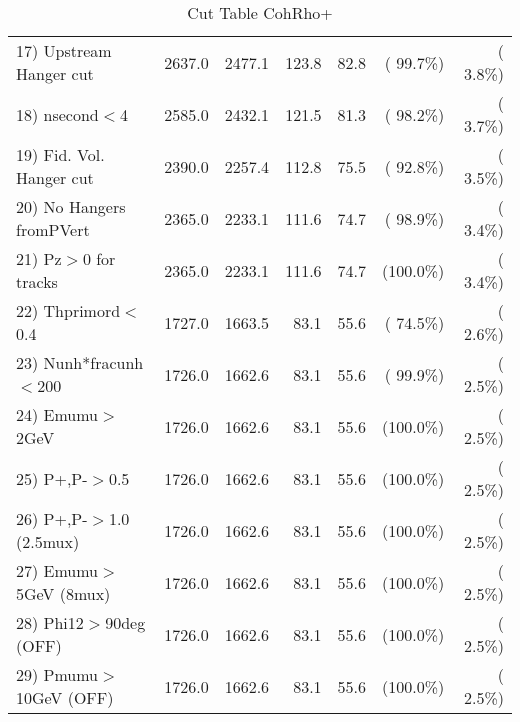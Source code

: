\begin{table}[h!]
\begin{tabular}{||l||r|r|r|r|r|r||}
 17) Upstream Hanger cut  &       2637.0 &       2477.1 &        123.8 &         82.8 & ( 99.7\%) & (  3.8\%) \\
 18) nsecond$<$4          &       2585.0 &       2432.1 &        121.5 &         81.3 & ( 98.2\%) & (  3.7\%) \\
 19) Fid. Vol. Hanger cut &       2390.0 &       2257.4 &        112.8 &         75.5 & ( 92.8\%) & (  3.5\%) \\
 20) No Hangers fromPVert &       2365.0 &       2233.1 &        111.6 &         74.7 & ( 98.9\%) & (  3.4\%) \\
 21) Pz$>$0 for tracks    &       2365.0 &       2233.1 &        111.6 &         74.7 & (100.0\%) & (  3.4\%) \\
 22) Thprimord$<$0.4      &       1727.0 &       1663.5 &         83.1 &         55.6 & ( 74.5\%) & (  2.6\%) \\
 23) Nunh*fracunh$<$200   &       1726.0 &       1662.6 &         83.1 &         55.6 & ( 99.9\%) & (  2.5\%) \\
 24) Emumu$>$2GeV         &       1726.0 &       1662.6 &         83.1 &         55.6 & (100.0\%) & (  2.5\%) \\
 25) P+,P-$>$0.5          &       1726.0 &       1662.6 &         83.1 &         55.6 & (100.0\%) & (  2.5\%) \\
 26) P+,P-$>$1.0 (2.5mux) &       1726.0 &       1662.6 &         83.1 &         55.6 & (100.0\%) & (  2.5\%) \\
 27) Emumu$>$5GeV  (8mux) &       1726.0 &       1662.6 &         83.1 &         55.6 & (100.0\%) & (  2.5\%) \\
 28) Phi12$>$90deg  (OFF) &       1726.0 &       1662.6 &         83.1 &         55.6 & (100.0\%) & (  2.5\%) \\
 29) Pmumu$>$10GeV  (OFF) &       1726.0 &       1662.6 &         83.1 &         55.6 & (100.0\%) & (  2.5\%) \\
 \hline
 \hline
 \end{tabular}
 \caption{Cut Table  CohRho+  }
 \label{tab-cutcohjpsi-mumu_cohrhop}
 \end{table}
